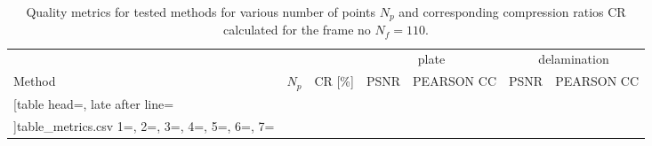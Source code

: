 \begin{table}[!ht]
	\renewcommand{\arraystretch}{1.3}
	\centering \footnotesize
	\caption{Quality metrics for tested methods for various number of points $N_p$ and corresponding compression ratios CR calculated for the frame no $N_f=110$.}	
	\begin{tabular}{lrrrcrc} 
		\toprule
		& & & \multicolumn{2}{c}{plate} & \multicolumn{2}{c}{delamination} \\
		\cmidrule(lr){4-5} \cmidrule(lr){6-7}
		Method & $N_p$ & CR [\%] & PSNR & PEARSON CC& PSNR & PEARSON CC \\
		\midrule
		\csvreader
		[table head=\toprule,
		late after line=\\ 
		]{table_metrics.csv}{
		1=\one, 2=\two, 3=\three, 4=\four, 5=\five, 6=\six, 7=\seven
		}%
		{\one & \two & \three & \four & \five & \six & \seven }%
		\bottomrule
	\end{tabular}	
	\label{tab:csv_results}
\end{table}